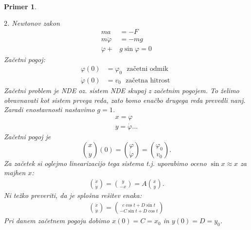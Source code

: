 \documentclass{article}
\newtheorem{primer}{Primer}
\begin{document}
\begin{primer}
\begin{center}
\end{center}
$2$. Newtonov zakon
\begin{align*}
ma &= -F \\
m\ddot{\varphi} &= -mg \\
\ddot{\varphi} + &g\sin{\varphi} = 0
\end{align*}
Začetni pogoj:
\begin{align*}
\varphi(0) &= \varphi_0\,\, \text{ začetni odmik }\\
\dot{\varphi}(0) &= v_0 \,\, \text{ začetna hitrost }
\end{align*}
Začetni problem je NDE oz. sistem NDE skupaj z začetnim pogojem.
To želimo obravnavati kot sistem prvega reda, zato bomo enačbo
drugega reda prevedli nanj. Zaradi enostavnosti nastavimo $g = 1$.
\begin{align*}
x = \varphi \\
y = \dot{\varphi} ... 
\end{align*}
Začetni pogoj je 
$$
\binom{x}{y}(0) = \binom{\varphi}{\dot{\varphi}} = \binom{\varphi_0}{v_0}.
$$
Za začetek si oglejmo linearizacijo tega sistema t.j. uporabimo oceno
$\sin{x} \approx x$ za majhen $x$:
\begin{align*}
\binom{\dot{x}}{\dot{y}} = \binom{y}{-x} = A\binom{x}{y}.
\end{align*}
Ni težko preveriti, da je splošna rešitev enaka:
\begin{align*}
\binom{\dot{x}}{\dot{y}} = \binom{c\cos{t} + D\sin{t}}{-C\sin{t} + D\cos{t}}
\end{align*}
Pri danem začetnem pogoju dobimo $x(0) = C = x_0$ in $y(0) = D = y_0$. 

\end{primer}
\end{document}
